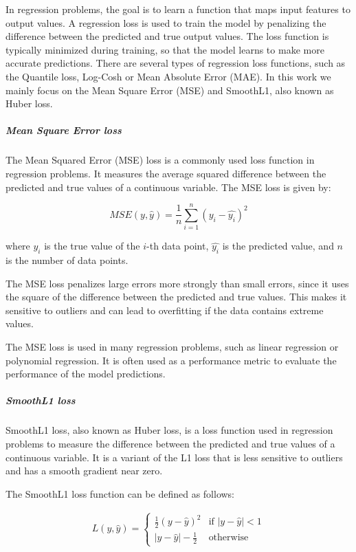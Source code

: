 In regression problems, the goal is to learn a function that maps input features to output values. A regression loss is used to train the model by penalizing the difference between the predicted and true output values. The loss function is typically minimized during training, so that the model learns to make more accurate predictions. There are several types of regression loss functions, such as the Quantile loss, Log-Cosh or Mean Absolute Error (MAE). In this work we mainly focus on the Mean Square Error (MSE) and SmoothL1, also known as Huber loss.

\subparagraph{Mean Square Error loss}
\label{subpar:3_mse_loss}

The Mean Squared Error (MSE) loss is a commonly used loss function in regression problems. It measures the average squared difference between the predicted and true values of a continuous variable. The MSE loss is given by:

\begin{equation}
	MSE(y, \hat{y}) = \frac{1}{n}\sum_{i=1}^{n}(y_i - \hat{y_i})^2
\end{equation}

where $y_i$ is the true value of the $i$-th data point, $\hat{y_i}$ is the predicted value, and $n$ is the number of data points.

The MSE loss penalizes large errors more strongly than small errors, since it uses the square of the difference between the predicted and true values. This makes it sensitive to outliers and can lead to overfitting if the data contains extreme values.

The MSE loss is used in many regression problems, such as linear regression or polynomial regression. It is often used as a performance metric to evaluate the performance of the model predictions.

\subparagraph{SmoothL1 loss}
\label{subpar:3_smoothL1_loss}

SmoothL1 loss, also known as Huber loss, is a loss function used in regression problems to measure the difference between the predicted and true values of a continuous variable. It is a variant of the L1 loss that is less sensitive to outliers and has a smooth gradient near zero.

The SmoothL1 loss function can be defined as follows:

\begin{equation}
\begin{split}
	L(y, \hat{y}) = \begin{cases}
		\frac{1}{2}(y - \hat{y})^2 & \text{if } |y - \hat{y}| < 1 \\
		|y - \hat{y}| - \frac{1}{2} & \text{otherwise} \
	\end{cases}
\end{split}
\end{equation}

